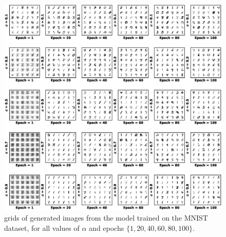 \begin{figure}
	\includegraphics*[width=\textwidth]{./plots/MNIST_digits_evoling.eps}
	\caption{grids of generated images from the model trained on the MNIST dataset, for all values of $\alpha$ and epochs $\{1,20,40,60,80,100\}$.}
	\label{fig:MNISTplots}
\end{figure}